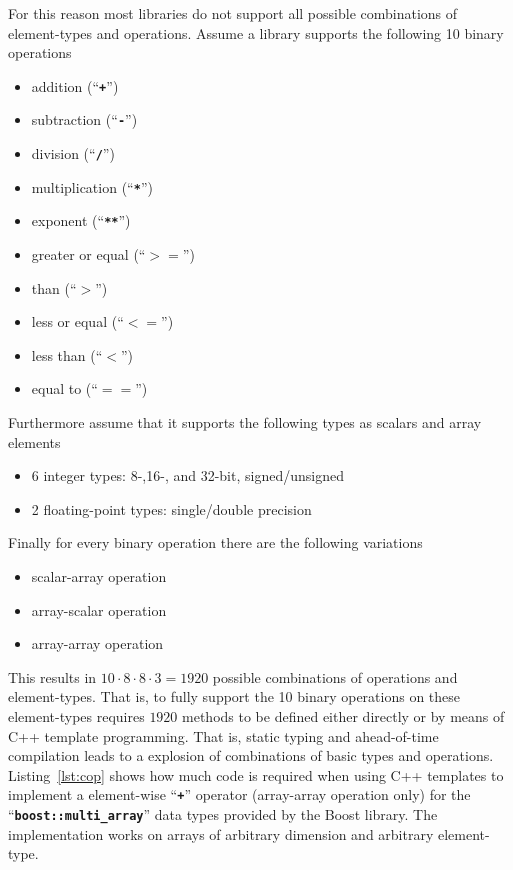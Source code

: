 \documentclass[12pt,a4paper,oneside,openright]{book}
\newcommand{\Ie}{That is, }
\newcommand{\lst}[1]{Listing~\ref{lst:#1}}
\newcommand{\removed}[1]{\cbstart\removedfragile{#1}\cbend{}}
\newcommand{\removedfragile}[1]{{\color{red}{\sout{#1}}}{}}
\newcommand{\added}[1]{\cbstart\addedfragile{#1}\cbend{}}
\newcommand{\addedfragile}[1]{{\color{green!50!black}{\uline{#1}}}{}}
\newcommand{\removed}[1]{}
\newcommand{\removedfragile}[1]{}
\newcommand{\added}[1]{#1}
\newcommand{\addedfragile}[1]{#1}
\newcommand{\changed}[2]{\removed{#1}\added{#2}}
\newcommand{\code}[1]{``\texttt{\textbf{\textcolor{codegray}{\small{#1}}}}''}
\begin{document}
\begin{CJK}{UTF8}{}
For this reason most libraries do not support all possible combinations of element-types and operations. Assume a library supports the following 10 binary operations
\begin{itemize}
\item addition (\code{+})
\item subtraction (\code{-})
\item division (\code{/})
\item multiplication (\code{*})
\item exponent (\code{**})
\item greater or equal (\code{$>=$})
\item \changed{less}{greater} than (\code{$>$})
\item less or equal (\code{$<=$})
\item less than (\code{$<$})
\item equal to (\code{$==$})
\end{itemize}
Furthermore assume that it supports the following types as scalars and array elements
\begin{itemize}
\item 6 integer types: 8-,16-, and 32-bit, signed/unsigned
\item 2 floating-point types: single/double precision
\end{itemize}
Finally for every binary operation there are the following variations
\begin{itemize}
\item scalar-array operation
\item array-scalar operation
\item array-array operation
\end{itemize}
This results in $10\cdot 8\cdot 8\cdot 3=1920$ possible combinations of operations and element-types. \Ie to fully support the 10 binary operations on these element-types requires $1920$ methods to be defined either directly or by means of C++ template programming. \Ie static typing and ahead-of-time compilation leads to a explosion of combinations of basic types and operations. \lst{cop} shows how much code is required when using C++ templates to implement a element-wise \code{+} operator (array-array operation only) for the \code{boost::multi\_array} data types provided by the Boost library. The implementation works on arrays of arbitrary dimension and arbitrary element-type.


\end{CJK}
\end{document}
